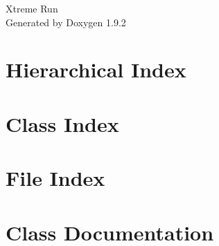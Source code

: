 \documentclass[twoside]{book}
\newcommand{\+}{\discretionary{\mbox{\scriptsize$\hookleftarrow$}}{}{}}
\newcommand{\clearemptydoublepage}{%
    \newpage{\pagestyle{empty}\cleardoublepage}%
  }
\begin{document}
  \raggedbottom
    \hypersetup{pageanchor=false,
                bookmarksnumbered=true,
                pdfencoding=unicode
               }
  \begin{titlepage}
  \vspace*{7cm}
  \begin{center}%
  {\Large Xtreme Run}\\
  \vspace*{1cm}
  {\large Generated by Doxygen 1.9.2}\\
  \end{center}
  \end{titlepage}
  \clearemptydoublepage
  \tableofcontents
  \clearemptydoublepage
  \hypersetup{pageanchor=true}
\chapter{Hierarchical Index}

\chapter{Class Index}

\chapter{File Index}

\chapter{Class Documentation}












































\end{document}
